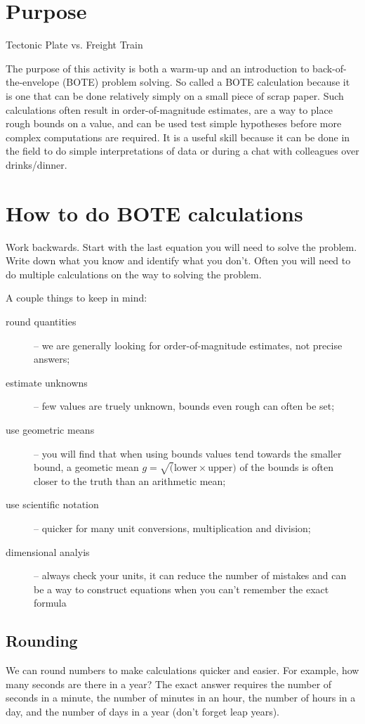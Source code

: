 \begin{activity}

\section{Purpose}{Tectonic Plate vs. Freight Train}

The purpose of this activity is both a warm-up and an introduction to back-of-the-envelope (BOTE) problem solving.  So called a BOTE calculation because it is one that can be done relatively simply on a small piece of scrap paper.  Such calculations often result in order-of-magnitude estimates, are a way to place rough bounds on a value, and can be used test simple hypotheses before more complex computations are required.  It is a useful skill because it can be done in the field to do simple interpretations of data or during a chat with colleagues over drinks/dinner.

\section{How to do BOTE calculations}

Work backwards.  Start with the last equation you will need to solve the problem.  Write down what you know and identify what you don't.  Often you will need to do multiple calculations on the way to solving the problem.

A couple things to keep in mind:
\begin{description}
    \item [round quantities] -- we are generally looking for order-of-magnitude estimates, not precise answers;
    \item [estimate unknowns] -- few values are truely unknown, bounds even rough can often be set;
    \item [use geometric means] -- you will find that when using bounds values tend towards the smaller bound, a geometic mean $g = \sqrt(\text{lower} \times \text{upper})$ of the bounds is often closer to the truth than an arithmetic mean;
    \item [use scientific notation] -- quicker for many unit conversions, multiplication and division;
    \item [dimensional analyis] -- always check your units, it can reduce the number of mistakes and can be a way to construct equations when you can't remember the exact formula
\end{description}

\subsection{Rounding}
We can round numbers to make calculations quicker and easier.  For example, how many seconds are there in a year?  The exact answer requires the number of seconds in a minute, the number of minutes in an hour, the number of hours in a day, and the number of days in a year (don't forget leap years).  


\end{activity}
